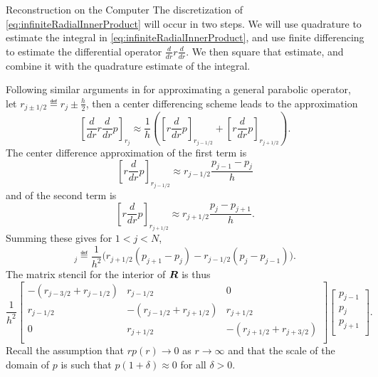 \begin{chapter}{Reconstruction on the Computer}
The discretization of \eqref{eq:infiniteRadialInnerProduct} will occur in two steps. 
We will use quadrature to estimate the integral in \eqref{eq:infiniteRadialInnerProduct}, and use finite differencing to estimate the differential operator $\frac d{dr} r \frac d{dr}$. 
We then square that estimate, and combine it with the quadrature estimate of the integral.

Following similar arguments in \citep{morton2005numerical} for approximating a general parabolic operator, let $r_{j\pm 1/2}\eqdef r_j \pm \frac h2$, then a center differencing scheme leads to the approximation 
\begin{equation}
  \left[\frac d{dr} r\frac d{dr} p\right]_{r_j} \approx\frac 1h\left( \left[r\frac d{dr}p\right]_{r_{j-1/2}} +  \left[r\frac d{dr}p\right]_{r_{j+1/2}}\right). 
\end{equation}
The center difference approximation of the first term is
\begin{equation}
  \left[r\frac d {dr}p\right]_{r_{j-1/2}} \approx r_{j-1/2} \frac{p_{j-1} - p_{j}}{h}
\end{equation}
and of the second term is
\begin{equation}
  \left[r\frac d {dr}p\right]_{r_{j+1/2}} \approx r_{j+1/2} \frac{p_{j} - p_{j+1}}{h}.
\end{equation}
Summing these gives for $1<j<N$,
\begin{equation}
  [\bm R \bm p]_j \eqdef \frac{1}{h^2} \Big( r_{j+1/2}(p_{j+1} - p_j) - r_{j-1/2}(p_{j} - p_{j-1})\Big).
  \label{laplacian_discretization}
\end{equation}
The matrix stencil for the interior of $\mbox{\boldmath$R$}$ is thus
\begin{equation}
  \frac{1}{h^2}
  \left[\begin{array}{ccc}
    -(r_{j-3/2} + r_{j-1/2}) & r_{j-1/2} & 0             \\
    r_{j-1/2} & -(r_{j-1/2} + r_{j+1/2}) & r_{j+1/2}     \\
    0 & r_{j+1/2} & -(r_{j+1/2} + r_{j+3/2}) \\
  \end{array}\right]
  \left[\begin{array}{c}
    p_{j-1} \\
    p_{j}   \\
    p_{j+1} \\
  \end{array}\right].
  \label{laplacian_discretization_stencil}
\end{equation}
Recall the assumption that $rp(r) \to 0$ as $r\to \infty$ and that the scale of the domain of $p$ is such that $p(1+\delta)\approx 0$ for all $\delta >0$.

\end{chapter}

